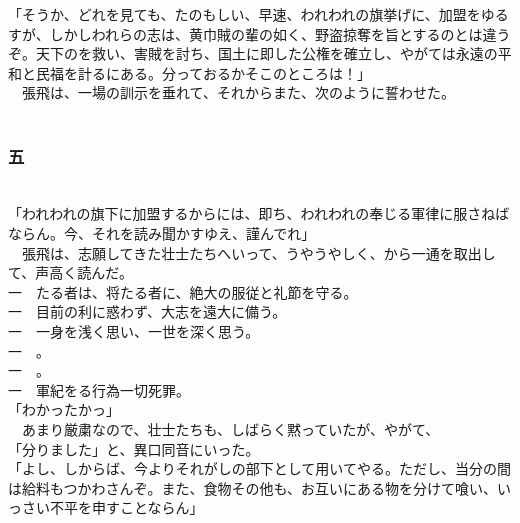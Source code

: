 \documentclass[
  paper=a5,
  fontsize=10pt,
  jafontsize=9.5pt,
  tate,                  %
  open_bracket_pos=nibu, %
]{jlreq}
\begin{document}
「そうか、どれを見ても、たのもしい、早速、われわれの旗挙げに、加盟をゆるすが、しかしわれらの志は、黄巾賊の輩の如く、野盗掠奪を旨とするのとは違うぞ。天下のを救い、害賊を討ち、国土に即した公権を確立し、やがては永遠の平和と民福を計るにある。分っておるかそこのところは！」\\


　張飛は、一場の訓示を垂れて、それからまた、次のように誓わせた。\\

\\

\subsubsection{五}

\\


「われわれの旗下に加盟するからには、即ち、われわれの奉じる軍律に服さねばならん。今、それを読み聞かすゆえ、謹んでれ」\\


　張飛は、志願してきた壮士たちへいって、うやうやしく、から一通を取出して、声高く読んだ。\\



一　たる者は、将たる者に、絶大の服従と礼節を守る。\\


一　目前の利に惑わず、大志を遠大に備う。\\


一　一身を浅く思い、一世を深く思う。\\


一　。\\


一　。\\


一　軍紀をる行為一切死罪。\\



「わかったかっ」\\


　あまり厳粛なので、壮士たちも、しばらく黙っていたが、やがて、\\


「分りました」と、異口同音にいった。\\


「よし、しからば、今よりそれがしの部下として用いてやる。ただし、当分の間は給料もつかわさんぞ。また、食物その他も、お互いにある物を分けて喰い、いっさい不平を申すことならん」\\
\end{document}
